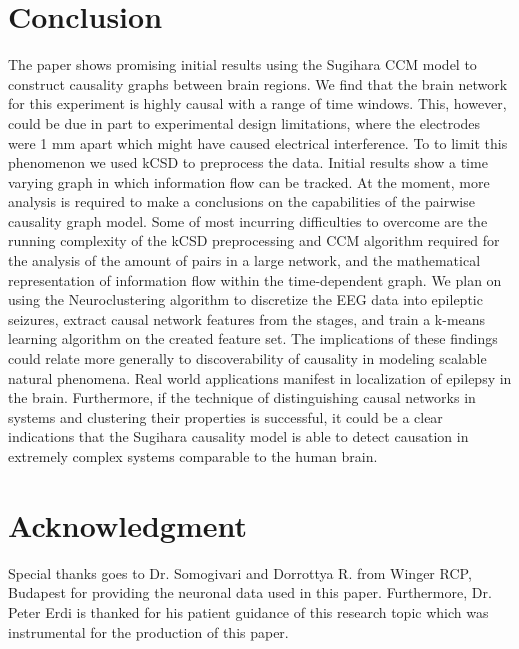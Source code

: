 \documentclass[journal,12pt,onecolumn,draftclsnofoot]{IEEEtran}  %
\begin{document}
\section{Conclusion}
The paper shows promising initial results using the Sugihara CCM model to construct causality graphs between brain regions. We find that the brain network for this experiment is highly causal with a range of time windows. This, however, could be due in part to experimental design limitations, where the electrodes were 1 mm apart which might have caused electrical interference. To to limit this phenomenon we used kCSD to preprocess the data. Initial results show a time varying graph in which information flow can be tracked. At the moment, more analysis is required to make a conclusions on the capabilities of the pairwise causality graph model. Some of most incurring difficulties to overcome are the running complexity of the kCSD preprocessing and CCM algorithm required for the analysis of the amount of pairs in a large network, and the mathematical representation of information flow within the time-dependent graph. We plan on using the Neuroclustering algorithm to discretize the EEG data into epileptic seizures, extract causal network features from the stages, and train a k-means learning algorithm on the created feature set. The implications of these findings could relate more generally to discoverability of causality in modeling scalable natural phenomena. Real world applications manifest in localization of epilepsy in the brain. Furthermore, if the technique of distinguishing causal networks in systems and clustering their properties is successful, it could be a clear indications that the Sugihara causality model is able to detect causation in extremely complex systems comparable to the human brain.

\section*{Acknowledgment}

Special thanks goes to Dr. Somogivari and Dorrottya R. from Winger RCP, Budapest for providing the neuronal data used in this paper. Furthermore, Dr. Peter Erdi is thanked for his patient guidance of this research topic which was instrumental for the production of this paper.

\balance


\end{document}
